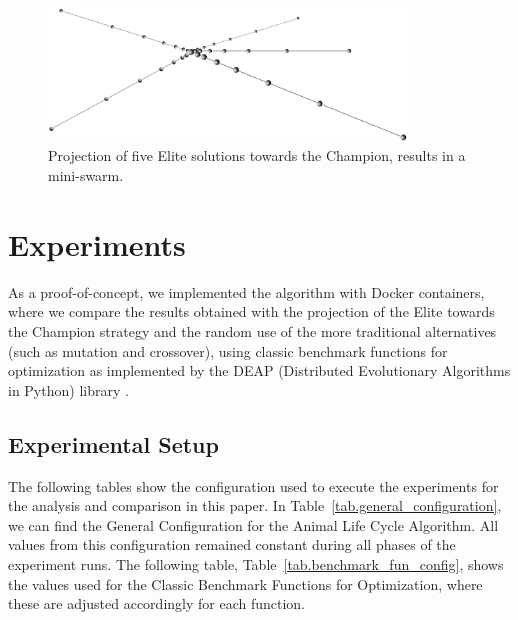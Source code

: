 \documentclass[graybox]{svmult}
\begin{document}
        \begin{figure}
            \centering
            \includegraphics[width=0.85\textwidth]{img/fig_elite_projection_swarm.pdf}
            \caption{Projection of five Elite solutions towards the Champion, results in a mini-swarm.} \label{fig.elite_projection_swarm}
            \end{figure}

\section{Experiments}
    \label{section.experiments}

    As a proof-of-concept, we implemented the algorithm with Docker containers,
    where we compare the results obtained with the projection of the Elite towards
    the Champion strategy and the random use of the more traditional alternatives
    (such as mutation and crossover), using classic benchmark functions for
    optimization as implemented by the DEAP (Distributed Evolutionary Algorithms in
    Python) library \cite{fortin2012deap}.

    \subsection{Experimental Setup} 

        The following tables show the configuration used to execute the experiments for
        the analysis and comparison in this paper. In
        Table~\ref{tab.general_configuration}, we can find the General Configuration
        for the Animal Life Cycle Algorithm. All values from this configuration
        remained constant during all phases of the experiment runs. The following
        table, Table~\ref{tab.benchmark_fun_config}, shows the values used for the
        Classic Benchmark Functions for Optimization, where these are adjusted
        accordingly for each function.
\end{document}
